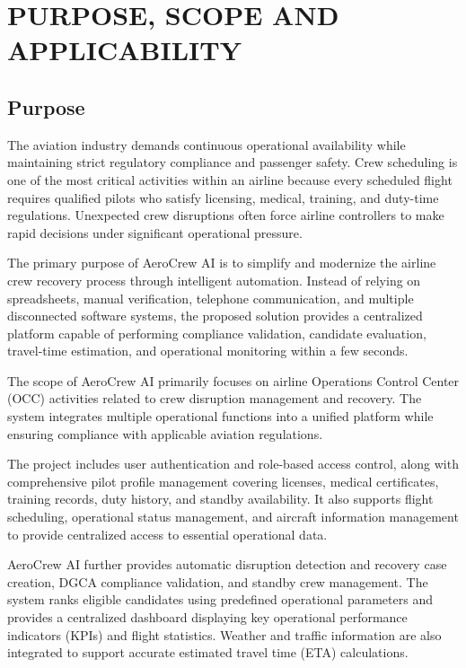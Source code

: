 \documentclass[12pt,a4paper]{report}
\begin{document}
\section{PURPOSE, SCOPE AND APPLICABILITY}

\subsection{Purpose}

The aviation industry demands continuous operational availability while maintaining strict regulatory compliance and passenger safety. Crew scheduling is one of the most critical activities within an airline because every scheduled flight requires qualified pilots who satisfy licensing, medical, training, and duty-time regulations. Unexpected crew disruptions often force airline controllers to make rapid decisions under significant operational pressure.

The primary purpose of AeroCrew AI is to simplify and modernize the airline crew recovery process through intelligent automation. Instead of relying on spreadsheets, manual verification, telephone communication, and multiple disconnected software systems, the proposed solution provides a centralized platform capable of performing compliance validation, candidate evaluation, travel-time estimation, and operational monitoring within a few seconds.

The scope of AeroCrew AI primarily focuses on airline Operations Control Center (OCC) activities related to crew disruption management and recovery. The system integrates multiple operational functions into a unified platform while ensuring compliance with applicable aviation regulations.

The project includes user authentication and role-based access control, along with comprehensive pilot profile management covering licenses, medical certificates, training records, duty history, and standby availability. It also supports flight scheduling, operational status management, and aircraft information management to provide centralized access to essential operational data.

AeroCrew AI further provides automatic disruption detection and recovery case creation, DGCA compliance validation, and standby crew management. The system ranks eligible candidates using predefined operational parameters and provides a centralized dashboard displaying key operational performance indicators (KPIs) and flight statistics. Weather and traffic information are also integrated to support accurate estimated travel time (ETA) calculations.
\end{document}
